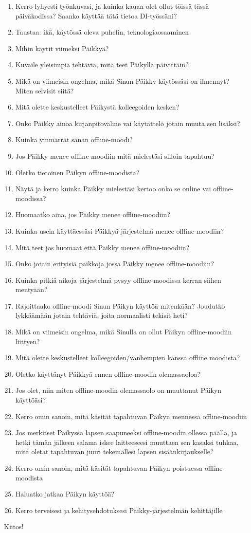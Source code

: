 \begin{enumerate}
\item Kerro lyhyesti työnkuvasi, ja kuinka kauan olet ollut töissä tässä päiväkodissa? Saanko käyttää tätä tietoa DI-työssäni?
\item Taustaa: ikä, käytössä oleva puhelin, teknologiaosaaminen
\item Mihin käytit viimeksi Päikkyä?
\item Kuvaile yleisimpiä tehtäviä, mitä teet Päikyllä päivittäin?
\item Mikä on viimeisin ongelma, mikä Sinun Päikky-käytössäsi on ilmennyt? Miten selvisit siitä?
\item Mitä olette keskustelleet Päikystä kolleegoiden kesken?
\item Onko Päikky ainoa kirjanpitoväline vai käytättelö jotain muuta sen lisäksi?
\item Kuinka ymmärrät sanan offline-moodi?
\item Jos Päikky menee offline-moodiin mitä mielestäsi silloin tapahtuu?
\item Oletko tietoinen Päikyn offline-moodista?
\item Näytä ja kerro kuinka Päikky mielestäsi kertoo onko se online vai offline-moodissa?
\item Huomaatko aina, jos Päikky menee offline-moodiin?
\item Kuinka usein käyttäessäsi Päikkyä järjestelmä menee offline-moodiin?
\item Mitä teet jos huomaat että Päikky menee offline-moodiin?
\item Onko jotain erityisiä paikkoja jossa Päikky menee offline-moodiin?
\item Kuinka pitkiä aikoja järjestelmä pysyy offline-moodissa kerran siihen mentyään?
\item Rajoittaako offline-moodi Sinun Päikyn käyttöä mitenkään? Joudutko lykkäämään jotain tehtäviä, joita normaalisti tekisit heti?
\item Mikä on viimeisin ongelma, mikä Sinulla on ollut Päikyn offline-moodiin liittyen?
\item Mitä olette keskustelleet kolleegoiden/vanhempien kanssa offline moodista?
\item Oletko käyttänyt Päikkyä ennen offline-moodin olemassaoloa?
\item Jos olet, niin miten offline-moodin olemassaolo on muuttanut Päikyn käyttöäsi?
\item Kerro omin sanoin, mitä käsität tapahtuvan Päikyn mennessä offline-moodiin
\item Jos merkitset Päikyssä lapsen saapuneeksi offline-moodin ollessa päällä, ja hetki tämän jälkeen salama iskee laitteeseesi muuttaen sen kasaksi tuhkaa, mitä oletat tapahtuvan juuri tekemällesi lapsen sisäänkirjaukselle?
\item Kerro omin sanoin, mitä käsität tapahtuvan Päikyn poistuessa offline-moodista
\item Haluatko jatkaa Päikyn käyttöä?
\item Kerro terveisesi ja kehitysehdotuksesi Päikky-järjestelmän kehittäjille
\end{enumerate}

Kiitos!

